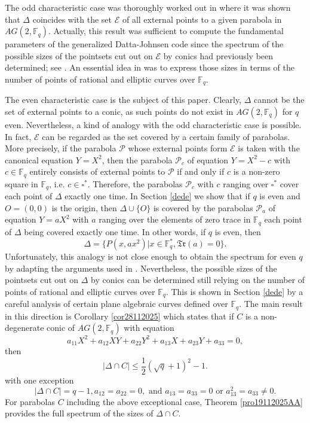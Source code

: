 \documentclass[sn-mathphys-num]{sn-jnl}%
\begin{document}
 The odd characteristic case was thoroughly worked out in \cite{GKNPS} where it was shown that $\Delta$ coincides with the set $\mathcal{E}$ of all external points to a given parabola in $AG(2,\mathbb{F}_q)$. Actually, this result was sufficient to compute the fundamental parameters of the generalized Datta-Johnsen code since the spectrum of the possible sizes of the pointsets cut out on $\mathcal{E}$ by conics had previously been determined; see \cite{AFKL}.
 An essential idea in \cite{AFKL} was to express those sizes in terms of the number of points of rational and elliptic curves over $\mathbb{F}_q$.

 The even characteristic case is the subject of this paper. Clearly, $\Delta$ cannot be the set of external points to a conic, as such points do not exist in $AG(2,\mathbb{F}_q)$ for $q$ even. Nevertheless, a kind of analogy with the odd characteristic case is possible. In fact, $\mathcal{E}$ can be regarded as the set covered by a certain family of parabolas. More precisely, if the parabola $\mathcal P$ whose external points form $\mathcal{E}$ is taken with the canonical equation $Y=X^2$, then the parabola $\mathcal{P}_c$ of equation $Y=X^2-c$ with $c\in \mathbb{F}_q$ entirely consists of external points to $\mathcal{P}$ if and only if $c$ is a non-zero square in $\mathbb{F}_q$, i.e. $c\in \square ^*$. Therefore, the parabolas $\mathcal{P}_c$ with $c$ ranging over $\square^*$ cover each point of $\Delta$ exactly one time. In Section \ref{dede} we show that if $q$ is even and $O=(0,0)$ is the origin, then $\Delta\cup \{O\}$ is covered by the parabolas $\mathcal{P}_a$ of equation $Y=aX^2$ with $a$ ranging over the elements of zero trace in $\mathbb{F}_q$ each point of $\Delta$ being covered exactly one time. In other words, if $q$ is even, then
 $$\Delta=\{P(x,ax^2)|x\in \mathbb{F}_q^*, \mathfrak{Tr}(a)=0\}.$$
 Unfortunately, this analogy is not close enough to obtain the spectrum for even $q$ by adapting the arguments used in \cite{AFKL}. Nevertheless, the possible sizes of the pointsets cut out on $\Delta$ by conics can be determined still relying on the number of points of rational and elliptic curves over $\mathbb{F}_q$. This is shown in Section \ref{dede} by a careful analysis of certain plane algebraic curves defined over $\mathbb{F}_q$. The main result in this direction is Corollary \ref{cor28112025} which states that
 if $C$ is a non-degenerate conic of $AG(2,\mathbb{F}_q)$ with equation
$$a_{11}X^2+a_{12}XY+a_{22}Y^2+a_{13}X+a_{23}Y+a_{33}=0,$$
then $$
|\Delta\cap C|\le \textstyle{\frac{1}{2}}(\sqrt{q}+1)^2-1.
$$
with one exception
 $$|\Delta\cap C|=q-1, a_{12}=a_{22}=0, \mbox{ and } a_{13}=a_{33}=0 \mbox{ or } a_{13}^2=a_{33}\ne 0.$$
For parabolas $C$ including the above exceptional case, Theorem \ref{pro19112025AA} provides the full spectrum of the sizes of $\Delta\cap C$.
\end{document}
